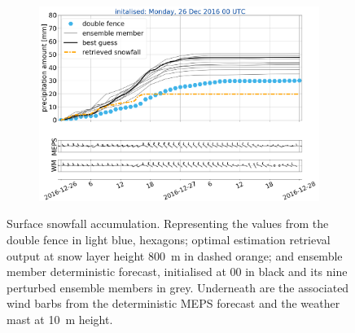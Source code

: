 \begin{figure}
\begin{subfigure}[b]{0.49\textwidth}
			\caption{}\label{fig:sfc_acc25}
		\end{subfigure}
		\begin{subfigure}[b]{0.49\textwidth}
			\includegraphics[width=\textwidth]{./fig_sfc_acc/acc_wind_20161226_00}
			\caption{}\label{fig:sfc_acc26}
		\end{subfigure}
    \caption{Surface snowfall accumulation. Representing the values from the double fence in light blue, hexagons; optimal estimation retrieval output at snow layer height \SI{800}{\metre} in dashed orange; and ensemble member deterministic forecast, initialised at \SI{00}{\UTC} in black and its nine perturbed ensemble members in grey. Underneath are the associated wind barbs from the deterministic MEPS forecast and the weather mast at \SI{10}{\metre} height. }\label{fig:sfc_acc}
	\end{figure}

	
